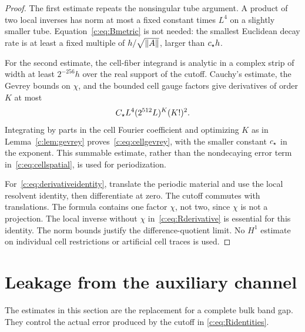 \begin{proof}
The first estimate repeats the nonsingular tube argument. A product of
two local inverses has norm at most a fixed constant times $L^4$ on
a slightly smaller tube. Equation~\eqref{c:eq:Bmetric} is not needed:
the smallest Euclidean decay rate is at least a fixed multiple of
$h/\sqrt{\left\lVert A\right\rVert}$, larger than $c_\star h$.

For the second estimate, the cell-fiber integrand is analytic in a
complex strip of width at least $2^{-256}h$ over the real support of
the cutoff. Cauchy's estimate, the Gevrey bounds on $\chi$, and the
bounded cell gauge factors give derivatives of order $K$ at most
\[
 C_\star L^4(2^{512}L)^K(K!)^2.
\]
Integrating by parts in the cell Fourier coefficient and optimizing
$K$ as in Lemma~\ref{c:lem:gevrey} proves~\eqref{c:eq:cellgevrey}, with
the smaller constant $c_\star$ in the exponent. This summable estimate,
rather than the nondecaying error term in~\eqref{c:eq:cellspatial}, is
used for periodization.

For~\eqref{c:eq:derivativeidentity}, translate the periodic material and
use the local resolvent identity, then differentiate at zero. The
cutoff commutes with translations. The formula contains
one factor $\chi$, not two, since $\chi$ is not a projection. The local
inverse without $\chi$ in~\eqref{c:eq:Rderivative} is essential for
this identity. The norm bounds justify the difference-quotient limit.
No $H^1$ estimate on individual cell restrictions or artificial cell
traces is used.
\end{proof}

\section{Leakage from the auxiliary channel}
\label{c:sec:leakage}

The estimates in this section are the replacement for a complete bulk
band gap. They control the actual error produced by the cutoff in
\eqref{c:eq:Ridentities}.

